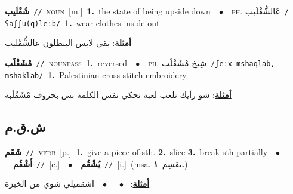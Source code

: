 \documentclass[10pt,a4paper,twoside]{article} %
\begin{document}
\begin{multicols}{2}
{\setlength\topsep{0pt}\textbf{\foreignlanguage{arabic}{شُقْلَيب}}\ {\color{gray}\texttt{//}\color{black}}\ \textsc{noun}\ [m.]\ \textbf{1.}~the state of being upside down\ \ $\bullet$\ \ \textsc{ph.} \color{gray} \foreignlanguage{arabic}{عَالشُّقْلَيب}\color{black}\ {\color{gray}\texttt{/{\sffamily ʕaʃʃu(q)leːb}/}\color{black}}\ \textbf{1.}~wear clothes inside out\  \begin{flushright}\color{gray}\foreignlanguage{arabic}{\textbf{\underline{\foreignlanguage{arabic}{أمثلة}}}: بقى لابس البنطلون عالشُّقْليب}\end{flushright}\color{black}} \vspace{2mm}

{\setlength\topsep{0pt}\textbf{\foreignlanguage{arabic}{مْشَقْلَب}}\ {\color{gray}\texttt{//}\color{black}}\ \textsc{noun\textunderscore pass}\ \textbf{1.}~reversed\ \ $\bullet$\ \ \textsc{ph.} \color{gray} \foreignlanguage{arabic}{شِيخ مْشَقْلَب}\color{black}\ {\color{gray}\texttt{/{\sffamily ʃeːx mshaqlab, mshaklab}/}\color{black}}\ \textbf{1.}~Palestinian cross-stitch embroidery\  \begin{flushright}\color{gray}\foreignlanguage{arabic}{\textbf{\underline{\foreignlanguage{arabic}{أمثلة}}}: شو رأيك نلعب لعبة نحكي نفس الكلمة بس بحروف مْشَقْلَبة}\end{flushright}\color{black}} \vspace{2mm}

\vspace{-3mm}
\subsection*{\color{blue}\foreignlanguage{arabic}{ش.ق.م}\color{blue}{}} 

{\setlength\topsep{0pt}\textbf{\foreignlanguage{arabic}{شَقَم}}\ {\color{gray}\texttt{//}\color{black}}\ \textsc{verb}\ [p.]\ \textbf{1.}~give a piece of sth.  \textbf{2.}~slice  \textbf{3.}~break sth partially\ \ $\bullet$\ \ \setlength\topsep{0pt}\textbf{\foreignlanguage{arabic}{اُشْقُم}}\ {\color{gray}\texttt{//}\color{black}}\ [c.]\ \ $\bullet$\ \ \setlength\topsep{0pt}\textbf{\foreignlanguage{arabic}{يُشْقُم}}\ {\color{gray}\texttt{//}\color{black}}\ [i.]\ \color{gray}(msa. \foreignlanguage{arabic}{يقسِم}~\foreignlanguage{arabic}{\textbf{١.}})\color{black}\  \begin{flushright}\color{gray}\foreignlanguage{arabic}{\textbf{\underline{\foreignlanguage{arabic}{أمثلة}}}: \ $\bullet$\ \  \ $\bullet$\ \  اشقميلي شوي من الخبزة}\end{flushright}\color{black}} \vspace{2mm}


\end{multicols}
\end{document}
